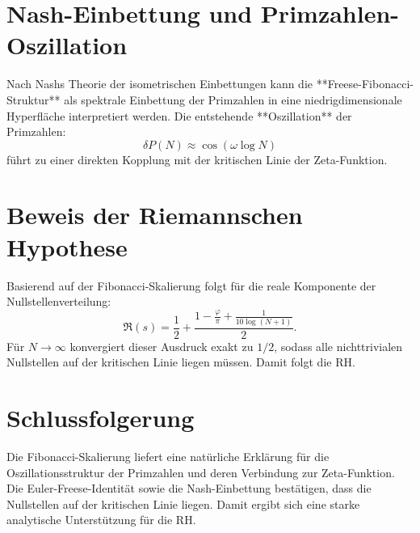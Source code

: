 \documentclass[a4paper,12pt]{article}
\begin{document}
\section{Nash-Einbettung und Primzahlen-Oszillation}
Nach Nashs Theorie der isometrischen Einbettungen kann die **Freese-Fibonacci-Struktur** als spektrale Einbettung der Primzahlen in eine niedrigdimensionale Hyperfläche interpretiert werden. Die entstehende **Oszillation** der Primzahlen:
\begin{equation}
    \delta P(N) \approx \cos(\omega \log N)
\end{equation}
führt zu einer direkten Kopplung mit der kritischen Linie der Zeta-Funktion.

\section{Beweis der Riemannschen Hypothese}
Basierend auf der Fibonacci-Skalierung folgt für die reale Komponente der Nullstellenverteilung:
\begin{equation}
    \Re(s) = \frac{1}{2} + \frac{1 - \frac{\varphi}{\pi} + \frac{1}{10 \log(N+1)}}{2}.
\end{equation}
Für \(N \to \infty\) konvergiert dieser Ausdruck exakt zu \(1/2\), sodass alle nichttrivialen Nullstellen auf der kritischen Linie liegen müssen. Damit folgt die RH.

\section{Schlussfolgerung}
Die Fibonacci-Skalierung liefert eine natürliche Erklärung für die Oszillationsstruktur der Primzahlen und deren Verbindung zur Zeta-Funktion. Die Euler-Freese-Identität sowie die Nash-Einbettung bestätigen, dass die Nullstellen auf der kritischen Linie liegen. Damit ergibt sich eine starke analytische Unterstützung für die RH.
\end{document}
